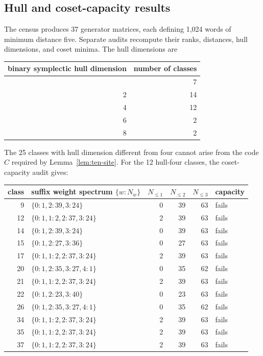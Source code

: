 \documentclass[11pt]{article}
\begin{document}
\subsection{Hull and coset-capacity results}\label{hull-and-coset-capacity-results}

The census produces 37 generator matrices, each defining 1,024 words of minimum distance five. Separate audits recompute their ranks, distances, hull dimensions, and coset minima. The hull dimensions are

{\def\LTcaptype{none} %
\begin{longtable}[]{@{}rr@{}}
\toprule\noalign{}
binary symplectic hull dimension & number of classes \\
\midrule\noalign{}
\endhead
\bottomrule\noalign{}
\endlastfoot
0 & 7 \\
2 & 14 \\
4 & 12 \\
6 & 2 \\
8 & 2 \\
\end{longtable}
}

The 25 classes with hull dimension different from four cannot arise from the code \(C\) required by Lemma~\ref{lem:ten-site}. For the 12 hull-four classes, the coset-capacity audit gives:

{\small
\setlength{\tabcolsep}{4pt}
\begin{tabularx}{\linewidth}{@{}rXrrrl@{}}
\toprule
class & suffix weight spectrum \(\{w:N_w\}\) & \(N_{\leq1}\) & \(N_{\leq2}\) & \(N_{\leq3}\) & capacity \\
\midrule
9 & \(\{0:1,2:39,3:24\}\) & 0 & 39 & 63 & fails \\
12 & \(\{0:1,1:2,2:37,3:24\}\) & 2 & 39 & 63 & fails \\
14 & \(\{0:1,2:39,3:24\}\) & 0 & 39 & 63 & fails \\
15 & \(\{0:1,2:27,3:36\}\) & 0 & 27 & 63 & fails \\
17 & \(\{0:1,1:2,2:37,3:24\}\) & 2 & 39 & 63 & fails \\
20 & \(\{0:1,2:35,3:27,4:1\}\) & 0 & 35 & 62 & fails \\
21 & \(\{0:1,1:2,2:37,3:24\}\) & 2 & 39 & 63 & fails \\
22 & \(\{0:1,2:23,3:40\}\) & 0 & 23 & 63 & fails \\
26 & \(\{0:1,2:35,3:27,4:1\}\) & 0 & 35 & 62 & fails \\
34 & \(\{0:1,1:2,2:37,3:24\}\) & 2 & 39 & 63 & fails \\
35 & \(\{0:1,1:2,2:37,3:24\}\) & 2 & 39 & 63 & fails \\
37 & \(\{0:1,1:2,2:37,3:24\}\) & 2 & 39 & 63 & fails \\
\bottomrule
\end{tabularx}
}
\end{document}
